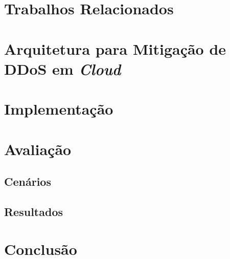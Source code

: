 \documentclass[a4paper, 12pt]{article}
\begin{document}
\section{Trabalhos Relacionados}


\section{Arquitetura para Mitigação de DDoS em \emph{Cloud}}



\section{Implementação}


\section{Avaliação}


\subsection{Cenários}


\subsection{Resultados}


\section{Conclusão}





\end{document}
